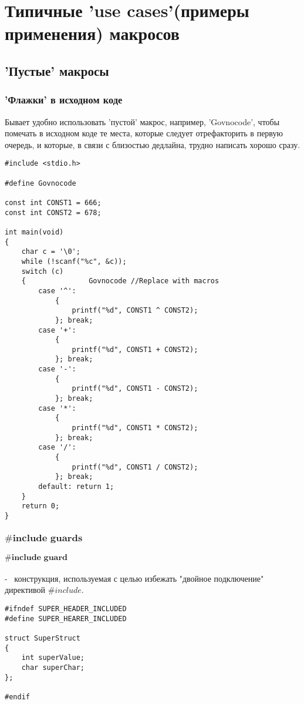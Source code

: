 \documentclass[a4paper]{article}
\begin{document}
\newpage
	
	\section{Типичные 'use cases'(примеры применения) макросов}
	
	\subsection{'Пустые' макросы}
	
	\subsubsection{'Флажки' в исходном коде}
	Бывает удобно использовать 'пустой' макрос, например, 'Govnocode', чтобы помечать в исходном коде те места, которые следует отрефакторить в первую очередь, и которые, в связи с близостью дедлайна, трудно написать хорошо сразу.
	\begin{lstlisting}[caption={Govnocode}]
#include <stdio.h>

#define Govnocode 

const int CONST1 = 666;
const int CONST2 = 678;

int main(void)
{
    char c = '\0';
    while (!scanf("%c", &c));
    switch (c)
    {               Govnocode //Replace with macros
        case '^':
            {
                printf("%d", CONST1 ^ CONST2);
            }; break;
        case '+':
            {
                printf("%d", CONST1 + CONST2);
            }; break;
        case '-':
            {
                printf("%d", CONST1 - CONST2);
            }; break;
        case '*':
            {
                printf("%d", CONST1 * CONST2);
            }; break;
        case '/':
            {
                printf("%d", CONST1 / CONST2);
            }; break;
        default: return 1;
    }
    return 0;
}
	\end{lstlisting}

\newpage

\subsubsection{$\textbf{\#include\ guards}$}

\paragraph{$\textbf{\#include\ guard}$} - \ конструкция, используемая с целью избежать "двойное подключение" директивой $\#include$.
	\begin{lstlisting}[caption={$\textbf{\#include\ guard}$}]
#ifndef SUPER_HEADER_INCLUDED
#define SUPER_HEARER_INCLUDED

struct SuperStruct
{
    int superValue;
    char superChar;
};

#endif
	\end{lstlisting}
	
\end{document}

